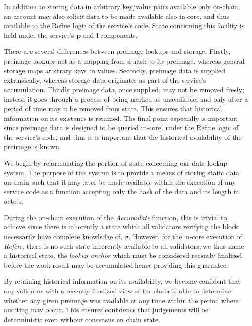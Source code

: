 In addition to storing data in arbitrary key/value pairs available only on-chain, an account may also solicit data to be made available also in-core, and thus available to the Refine logic of the service's code. State concerning this facility is held under the service's $\mathbf{p}$ and $\mathbf{l}$ components.

There are several differences between preimage-lookups and storage. Firstly, preimage-lookups act as a mapping from a hash to its preimage, whereas general storage maps arbitrary keys to values. Secondly, preimage data is supplied extrinsically, whereas storage data originates as part of the service's accumulation. Thirdly preimage data, once supplied, may not be removed freely; instead it goes through a process of being marked as unavailable, and only after a period of time may it be removed from state. This ensures that historical information on its existence is retained. The final point especially is important since preimage data is designed to be queried in-core, under the Refine logic of the service's code, and thus it is important that the historical availability of the preimage is known.

We begin by reformulating the portion of state concerning our data-lookup system. The purpose of this system is to provide a means of storing static data on-chain such that it may later be made available within the execution of any service code as a function accepting only the hash of the data and its length in octets.

During the on-chain execution of the \emph{Accumulate} function, this is trivial to achieve since there is inherently a state which all validators verifying the block necessarily have complete knowledge of, \ie $\sigma$. However, for the in-core execution of \emph{Refine}, there is no such state inherently available to all validators; we thus name a historical state, the \emph{lookup anchor} which must be considered recently finalized before the work result may be accumulated hence providing this guarantee.

By retaining historical information on its availability, we become confident that any validator with a recently finalized view of the chain is able to determine whether any given preimage was available at any time within the period where auditing may occur. This ensures confidence that judgements will be deterministic even without consensus on chain state.

